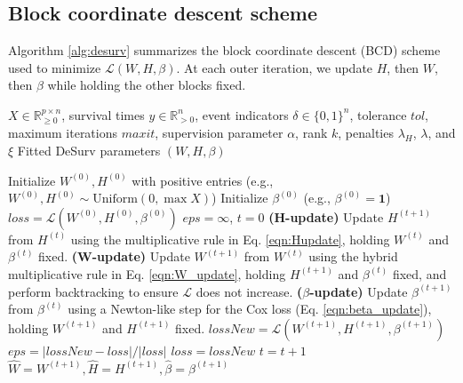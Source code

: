 \documentclass[
]{article}
\begin{document}
\subsection{Block coordinate descent scheme}

Algorithm \ref{alg:desurv} summarizes the block coordinate descent (BCD)
scheme used to minimize \(\mathcal{L}(W,H,\beta)\). At each outer
iteration, we update \(H\), then \(W\), then \(\beta\) while holding the
other blocks fixed.

\begin{algorithm}[htbp]
\caption{DeSurv block coordinate descent}
\label{alg:desurv}
    \begin{algorithmic}[1]
        \Require $X \in \mathbb{R}_{\geq 0}^{p \times n}$, survival times $y \in \mathbb{R}^n_{> 0}$, event indicators $\delta \in \{0,1\}^{n}$, tolerance $tol$, maximum iterations $maxit$, supervision parameter $\alpha$, rank $k$, penalties $\lambda_H$, $\lambda$, and $\xi$
        \Ensure Fitted DeSurv parameters $(W,H,\beta)$

        \State Initialize $W^{(0)}, H^{(0)}$ with positive entries (e.g., $W^{(0)},H^{(0)} \sim \mathrm{Uniform}(0,\max X)$)
        \State Initialize $\beta^{(0)}$ (e.g., $\beta^{(0)} = \mathbf{1}$)
        \State $loss = \mathcal{L}(W^{(0)},H^{(0)},\beta^{(0)})$
        \State $eps = \infty$, $t = 0$
            \State \textbf{(H-update)} 
            \State \hspace{0.5cm} Update $H^{(t+1)}$ from $H^{(t)}$ using the multiplicative rule in Eq. \ref{eqn:Hupdate}, 
            \State \hspace{0.5cm} holding $W^{(t)}$ and $\beta^{(t)}$ fixed.
            \State \textbf{(W-update)} 
            \State \hspace{0.5cm} Update $W^{(t+1)}$ from $W^{(t)}$ using the hybrid multiplicative rule in Eq. \ref{eqn:W_update},
            \State \hspace{0.5cm} holding $H^{(t+1)}$ and $\beta^{(t)}$ fixed, and perform backtracking to ensure 
            \State \hspace{0.5cm} $\mathcal{L}$ does not increase.
            \State \textbf{($\beta$-update)}
            \State \hspace{0.5cm} Update $\beta^{(t+1)}$ from $\beta^{(t)}$ using a Newton-like step for the Cox loss
            \State \hspace{0.5cm} (Eq. \ref{eqn:beta_update}), holding $W^{(t+1)}$ and $H^{(t+1)}$ fixed.
            \State $lossNew = \mathcal{L}(W^{(t+1)},H^{(t+1)},\beta^{(t+1)})$
            \State $eps = |lossNew - loss| / |loss|$
            \State $loss = lossNew$
            \State $t = t + 1$
        \EndWhile
        \State \Return $\hat{W} = W^{(t+1)}, \hat{H} = H^{(t+1)}, \hat{\beta}=\beta^{(t+1)}$
    \end{algorithmic}
\end{algorithm}
\end{document}
